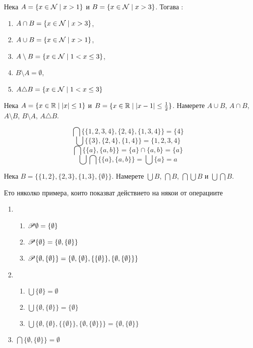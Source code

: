 \begin{example}
  Нека $A = \{x\in\mathcal{N}\mid x > 1\}$ и $B = \{x\in\mathcal{N}\mid x>3\}$. Тогава :
    \begin{enumerate}[]
    \item
      $A\cap B = \{x\in\mathcal{N}\mid x > 3\}$,
    \item
      $A\cup B = \{x\in\mathcal{N}\mid x > 1\}$,
    \item
      $A\setminus B = \{x\in\mathcal{N}\mid 1<x\leq 3\}$,
    \item
      $B\setminus A = \emptyset$,
    \item
      $A\triangle B = \{x\in\mathcal{N}\mid 1<x\leq 3\}$
    \end{enumerate}
\end{example}


\begin{problem}
  Нека $A = \{x\in\mathbb{R}\mid |x|\leq 1\}$ и $B = \{x\in\mathbb{R}\mid |x-1|\leq \frac{1}{2}\}$.
  Намерете $A\cup B$, $A\cap B$, $A\setminus B$, $B\setminus A$, $A\triangle B$.
\end{problem}



\begin{example}
  \[\bigcap\{\{1,2,3,4\},\{2,4\},\{1,3,4\}\} = \{4\}\]
  \[\bigcup\{\{3\},\{2,4\},\{1,4\}\} = \{1,2,3,4\}\]
  \[\bigcap\{\{a\},\{a,b\}\} = \{a\}\cap\{a,b\} = \{a\}\]
  \[\bigcup\bigcap\{\{a\},\{a,b\}\}  = \bigcup\{a\} = a\]
\end{example}


\begin{problem}
  Нека $B = \{\{1,2\},\{2,3\}, \{1,3\}, \{\emptyset\}\}$.
  Намерете $\bigcup{B}$, $\bigcap{B}$, $\bigcap\bigcup{B}$ и $\bigcup\bigcap{B}$.
\end{problem}


\begin{example}
  Ето няколко примера, които показват действието на някои от операциите
  \begin{enumerate}[1)]
  \item
    \begin{enumerate}[]
    \item
      $\mathscr{P}\emptyset = \{\emptyset\}$
    \item
      $\mathscr{P}\{\emptyset\} = \{\emptyset,\{\emptyset\}\}$
    \item
      $\mathscr{P}\{\emptyset,\{\emptyset\}\} = \{\emptyset,\{\emptyset\},\{\{\emptyset\}\}, \{\emptyset,\{\emptyset\}\}\}$
    \end{enumerate}
  \item
    \begin{enumerate}[]
    \item
      $\bigcup\{\emptyset\} = \emptyset$
    \item
      $\bigcup\{\emptyset,\{\emptyset\}\} = \{\emptyset\}$
    \item      
      $\bigcup\{\emptyset,\{\emptyset\},\{\{\emptyset\}\}, \{\emptyset,\{\emptyset\}\}\} = \{\emptyset,\{\emptyset\}\}$
    \end{enumerate}
  \item
    $\bigcap\{\emptyset,\{\emptyset\}\} = \emptyset$
\end{enumerate}
\end{example}




